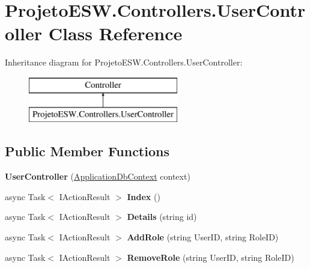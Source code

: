 \hypertarget{class_projeto_e_s_w_1_1_controllers_1_1_user_controller}{}\section{Projeto\+E\+S\+W.\+Controllers.\+User\+Controller Class Reference}
\label{class_projeto_e_s_w_1_1_controllers_1_1_user_controller}
Inheritance diagram for Projeto\+E\+S\+W.\+Controllers.\+User\+Controller\+:\begin{figure}[H]
\begin{center}
\leavevmode
\includegraphics[height=2.000000cm]{class_projeto_e_s_w_1_1_controllers_1_1_user_controller}
\end{center}
\end{figure}
\subsection*{Public Member Functions}
\begin{DoxyCompactItemize}
\item 
\mbox{\label{class_projeto_e_s_w_1_1_controllers_1_1_user_controller_ab6ec1e4e00b9a8f7edf411df03476e33}} 
{\bfseries User\+Controller} (\mbox{\hyperlink{class_projeto_e_s_w_1_1_data_1_1_application_db_context}{Application\+Db\+Context}} context)
\item 
\mbox{\label{class_projeto_e_s_w_1_1_controllers_1_1_user_controller_a90f7d64bd499a5eddc92ff96398a0420}} 
async Task$<$ I\+Action\+Result $>$ {\bfseries Index} ()
\item 
\mbox{\label{class_projeto_e_s_w_1_1_controllers_1_1_user_controller_a668058b6a5724f84ffab6757b29317e7}} 
async Task$<$ I\+Action\+Result $>$ {\bfseries Details} (string id)
\item 
\mbox{\label{class_projeto_e_s_w_1_1_controllers_1_1_user_controller_af71bd6814de94f58a6043aa779680108}} 
async Task$<$ I\+Action\+Result $>$ {\bfseries Add\+Role} (string User\+ID, string Role\+ID)
\item 
\mbox{\label{class_projeto_e_s_w_1_1_controllers_1_1_user_controller_a275821170014d7c51b61a60d86cce0cc}} 
async Task$<$ I\+Action\+Result $>$ {\bfseries Remove\+Role} (string User\+ID, string Role\+ID)
\end{DoxyCompactItemize}
